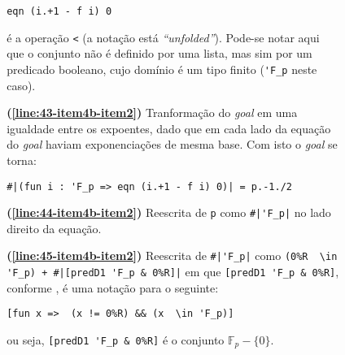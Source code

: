 \begin{enumerate}[label=\textbf{\roman*.}]
\begin{enumerate}[label=\textbf{\roman{enumi}.(\alph*)}]
\begin{enumerate}[label=\textbf{(\alph{enumii}.\arabic*)}]
\begin{enumerate}[listparindent=\parindent]
                                        \begin{lstlisting}[language=coq,frame=single,tabsize=1]
eqn (i.+1 - f i) 0
                                        \end{lstlisting}
                                é a operação \lstinline[language=coq]|<| (a notação está \textit{``unfolded''}). Pode-se notar aqui que o conjunto não é definido por uma lista, mas sim por um predicado booleano, cujo domínio é um tipo finito (\lstinline[language=coq]|'F_p| neste caso).

                                \item[\textbf{(\ref{line:43-item4b-item2})}] Tranformação do \textit{goal} em uma igualdade entre os expoentes, dado que em cada lado da equação do \textit{goal} haviam exponenciações de mesma base. Com isto o \textit{goal} se torna:
                                
                                        \begin{lstlisting}[language=coq,frame=single,tabsize=1]
#|(fun i : 'F_p => eqn (i.+1 - f i) 0)| = p.-1./2
                                        \end{lstlisting}

                                \item[\textbf{(\ref{line:44-item4b-item2})}] Reescrita de \lstinline[language=coq]|p| como \lstinline[language=coq]!#|'F_p|! no lado direito da equação.
                                
                                \item[\textbf{(\ref{line:45-item4b-item2})}] Reescrita de \lstinline[language=coq]!#|'F_p|! como \lstinline[language=coq]!(0%R  \in 'F_p) + #|[predD1 'F_p & 0%R]|! em que \lstinline[language=coq]![predD1 'F_p & 0%R]!, conforme \cite{mathcomp-eqtype}, é uma notação para o seguinte:
                                
                                        \begin{lstlisting}[language=coq,frame=single,tabsize=1]
[fun x =>  (x != 0%R) && (x  \in 'F_p)]
                                        \end{lstlisting}
                                ou seja, \lstinline[language=coq]![predD1 'F_p & 0%R]! é o conjunto $\mathbb{F}_p - \{0\}$.


\end{enumerate}
\end{enumerate}
\end{enumerate}
\end{enumerate}
